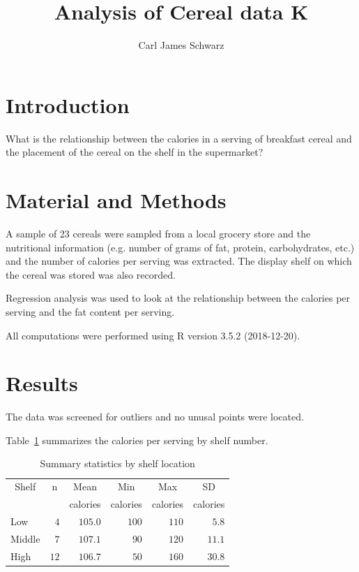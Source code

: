 \documentclass{article}\usepackage[]{graphicx}\usepackage[]{color}
\title{Analysis of Cereal data K}
\author{Carl James Schwarz}
\begin{document}
\maketitle




\section{Introduction}
What is the relationship between the calories in a serving of breakfast
cereal and the placement of the cereal on the shelf in the supermarket?


\section{Material and Methods}
A sample of 23 cereals were sampled from a local grocery store
and the nutritional information (e.g. number of grams of fat, protein, carbohydrates, etc.)
and the number of calories per serving was extracted. 
The display shelf on which the cereal was stored was also recorded.

Regression analysis was used to look at the relationship between
the calories per serving and the fat content per serving.

All computations were performed using R version 3.5.2 (2018-12-20).


\section{Results}
The data was screened for outliers and no unusal points were located.

Table~\ref{tab:table1} summarizes the calories per serving by shelf number.
\begin{table}[b]
\caption{Summary statistics by shelf location\label{tab:table1}} 
\begin{center}
\begin{tabular}{lrrrrr}
\hline\hline
\multicolumn{1}{c}{Shelf}&\multicolumn{1}{c}{n}&\multicolumn{1}{c}{Mean}&\multicolumn{1}{c}{Min}&\multicolumn{1}{c}{Max}&\multicolumn{1}{c}{SD}\tabularnewline
&&\multicolumn{1}{c}{{\scriptsize calories}}&\multicolumn{1}{c}{{\scriptsize calories}}&\multicolumn{1}{c}{{\scriptsize calories}}&\multicolumn{1}{c}{{\scriptsize calories}}\tabularnewline
\hline
Low&$ 4$&$105.0$&$100$&$110$&$ 5.8$\tabularnewline
Middle&$ 7$&$107.1$&$ 90$&$120$&$11.1$\tabularnewline
High&$12$&$106.7$&$ 50$&$160$&$30.8$\tabularnewline
\hline
\end{tabular}\end{center}
\end{table}
\end{document}
